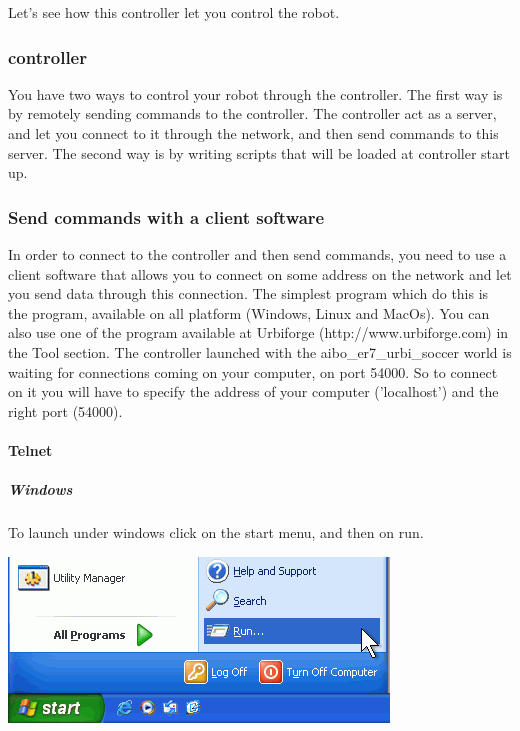 Let's see how this controller let you control the robot.


\subsubsection{\urbi controller}

You have two ways to control your robot through the \urbi
controller. The first way is by remotely sending commands to the \urbi
controller. The \urbi controller act as a server, and let you connect
to it through the network, and then send \urbi commands to this server.
The second way is by writing \urbi scripts that will be loaded at
controller start up.


\subsubsection{Send commands with a client software}

In order to connect to the \urbi controller and then send commands, you
need to use a client software that allows you to connect on some
address on the network and let you send data through this connection.
The simplest program which do this is the  program,
available on all platform (Windows, Linux and MacOs). You can also use
one of the program available at Urbiforge (http://www.urbiforge.com)
in the Tool section.  The \urbi controller launched with the
aibo\_er7\_urbi\_soccer world is waiting for connections coming on
your computer, on port 54000. So to connect on it you will have to
specify the address of your computer ('localhost') and the right port
(54000).


\paragraph{Telnet}

\subparagraph{Windows}

To launch  under windows click on the start menu, and
then on run.

\begin{center}
  \includegraphics[scale=.6]{img/webots/click-run-windows}
\end{center}

